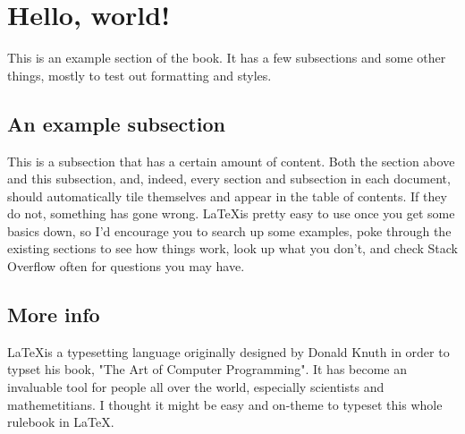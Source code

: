 \section{Hello, world!}
This is an example section of the book. It has a few subsections and some other things, mostly to test out formatting and styles.

\subsection{An example subsection}
This is a subsection that has a certain amount of content. Both the section above and this subsection, and, indeed, every section and subsection in each document, should automatically tile themselves and appear in the table of contents. If they do not, something has gone wrong. \LaTeX is pretty easy to use once you get some basics down, so I'd encourage you to search up some examples, poke through the existing sections to see how things work, look up what you don't, and check Stack Overflow often for questions you may have.

\subsection{More info}
\LaTeX is a typesetting language originally designed by Donald Knuth in order to typset his book, "The Art of Computer Programming". It has become an invaluable tool for people all over the world, especially scientists and mathemetitians. I thought it might be easy and on-theme to typeset this whole rulebook in \LaTeX.